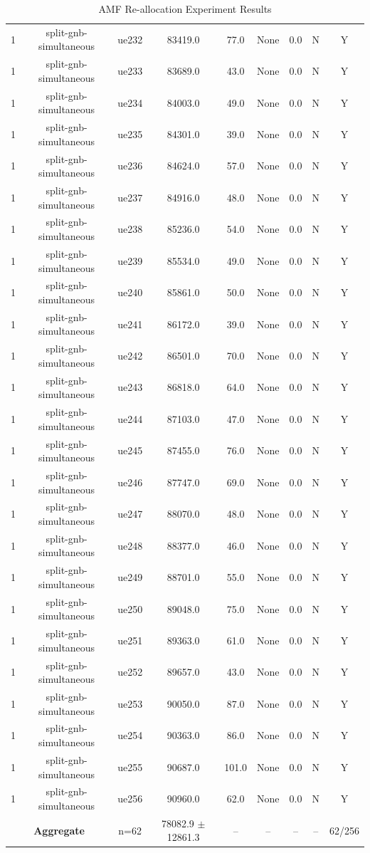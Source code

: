 \begin{table}[ht]
\begin{tabular}{|c|c|c|c|c|c|c|c|c|}
1 & split-gnb-simultaneous & ue232 & 83419.0 & 77.0 & None & 0.0 & N & Y \\
1 & split-gnb-simultaneous & ue233 & 83689.0 & 43.0 & None & 0.0 & N & Y \\
1 & split-gnb-simultaneous & ue234 & 84003.0 & 49.0 & None & 0.0 & N & Y \\
1 & split-gnb-simultaneous & ue235 & 84301.0 & 39.0 & None & 0.0 & N & Y \\
1 & split-gnb-simultaneous & ue236 & 84624.0 & 57.0 & None & 0.0 & N & Y \\
1 & split-gnb-simultaneous & ue237 & 84916.0 & 48.0 & None & 0.0 & N & Y \\
1 & split-gnb-simultaneous & ue238 & 85236.0 & 54.0 & None & 0.0 & N & Y \\
1 & split-gnb-simultaneous & ue239 & 85534.0 & 49.0 & None & 0.0 & N & Y \\
1 & split-gnb-simultaneous & ue240 & 85861.0 & 50.0 & None & 0.0 & N & Y \\
1 & split-gnb-simultaneous & ue241 & 86172.0 & 39.0 & None & 0.0 & N & Y \\
1 & split-gnb-simultaneous & ue242 & 86501.0 & 70.0 & None & 0.0 & N & Y \\
1 & split-gnb-simultaneous & ue243 & 86818.0 & 64.0 & None & 0.0 & N & Y \\
1 & split-gnb-simultaneous & ue244 & 87103.0 & 47.0 & None & 0.0 & N & Y \\
1 & split-gnb-simultaneous & ue245 & 87455.0 & 76.0 & None & 0.0 & N & Y \\
1 & split-gnb-simultaneous & ue246 & 87747.0 & 69.0 & None & 0.0 & N & Y \\
1 & split-gnb-simultaneous & ue247 & 88070.0 & 48.0 & None & 0.0 & N & Y \\
1 & split-gnb-simultaneous & ue248 & 88377.0 & 46.0 & None & 0.0 & N & Y \\
1 & split-gnb-simultaneous & ue249 & 88701.0 & 55.0 & None & 0.0 & N & Y \\
1 & split-gnb-simultaneous & ue250 & 89048.0 & 75.0 & None & 0.0 & N & Y \\
1 & split-gnb-simultaneous & ue251 & 89363.0 & 61.0 & None & 0.0 & N & Y \\
1 & split-gnb-simultaneous & ue252 & 89657.0 & 43.0 & None & 0.0 & N & Y \\
1 & split-gnb-simultaneous & ue253 & 90050.0 & 87.0 & None & 0.0 & N & Y \\
1 & split-gnb-simultaneous & ue254 & 90363.0 & 86.0 & None & 0.0 & N & Y \\
1 & split-gnb-simultaneous & ue255 & 90687.0 & 101.0 & None & 0.0 & N & Y \\
1 & split-gnb-simultaneous & ue256 & 90960.0 & 62.0 & None & 0.0 & N & Y \\
\multicolumn{2}{|c|}{\textbf{Aggregate}} & n=62 & 78082.9 $\pm$ 12861.3 & -- & -- & -- & -- & 62/256 \\
\hline
\end{tabular}
\caption{AMF Re-allocation Experiment Results}
\label{tab:amf_realloc}
\end{table}
